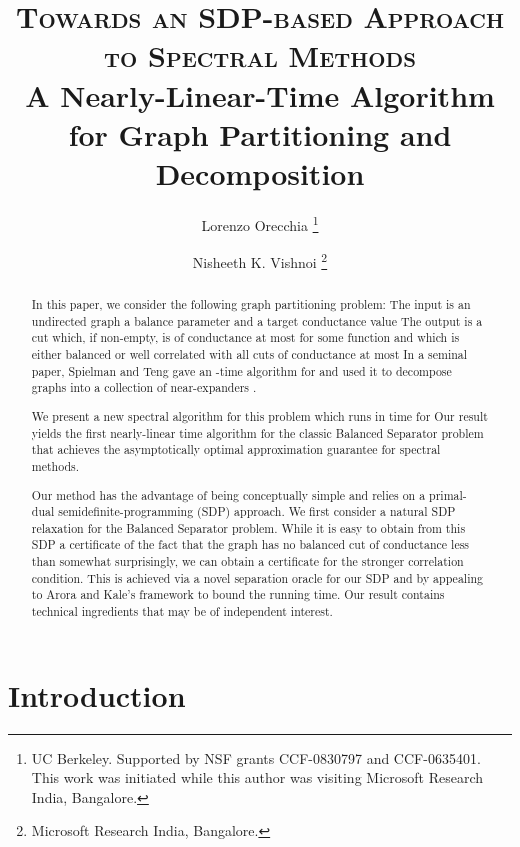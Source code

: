 \documentclass[twoside,leqno,twocolumn]{article}
\newcommand{\BS}{{\sc Balanced Separator}\xspace}
\newcommand{\SDP}{{\sf SDP}\xspace}
\numberwithin{equation}{section}
\begin{document}
\title{
  \textsc{Towards an SDP-based Approach to Spectral Methods}\\ {\Large A Nearly-Linear-Time Algorithm for Graph Partitioning and Decomposition}
}

\author{Lorenzo Orecchia  \thanks{UC Berkeley. Supported by NSF grants CCF-0830797 and CCF-0635401. This work was initiated while this author was visiting Microsoft Research India, Bangalore.}\\
\and 
Nisheeth K. Vishnoi \thanks{Microsoft Research India, Bangalore.}}
\date{}




\maketitle	

\begin{abstract}
In this paper, we consider the following graph partitioning problem: The input is an undirected graph  a balance parameter   and a target conductance value  
The  output is a cut which, if non-empty, is of conductance at most  for some function  and which  is either balanced or well correlated with all cuts of conductance at most  
In a seminal paper, Spielman and Teng \cite{ST1} gave an -time algorithm for  and used it to decompose graphs into a collection of near-expanders \cite{ST2}.

We present a new spectral algorithm for this problem which runs in time  for  Our result yields the first nearly-linear time algorithm for the classic \BS problem that achieves the asymptotically optimal approximation guarantee for spectral methods.

Our method has the advantage of being conceptually simple and relies on a primal-dual semidefinite-programming (\SDP) approach. 
We first consider a natural SDP relaxation for the \BS problem.  While it is easy to obtain from this SDP a certificate of the fact that the graph has no balanced cut of conductance less than  somewhat  surprisingly,  we can obtain a certificate for the stronger correlation condition. 
This is achieved via a novel separation oracle for our SDP and by appealing to Arora and Kale's \cite{AK}  framework to bound the running time.
Our result contains technical ingredients that may be  of independent interest.
\end{abstract}

\section{Introduction}
\end{document}
